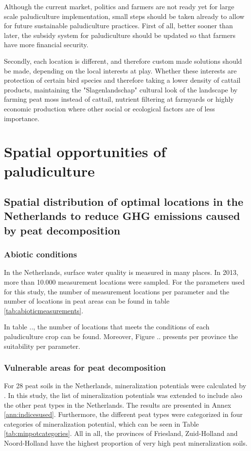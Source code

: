 {\begin{enumerate}
Although the current market, politics and farmers are not ready yet for large scale paludiculture implementation, small steps should be taken already to allow for future sustainable paludiculture practices. First of all, better sooner than later, the subsidy system for paludiculture should be updated so that farmers have more financial security. 

Secondly, each location is different, and therefore custom made solutions should be made, depending on the local interests at play. Whether these interests are protection of certain bird species and therefore taking a lower density of cattail products, maintaining the "Slagenlandschap" cultural look of the landscape by farming peat moss instead of cattail, nutrient filtering at farmyards or highly economic production where other social or ecological factors are of less importance.

\chapter{Spatial opportunities of paludiculture}

\section{Spatial distribution of optimal locations in the Netherlands to reduce GHG emissions caused by peat decomposition}

\subsection{Abiotic conditions}

In the Netherlands, surface water quality is measured in many places. In 2013, more than 10.000 measurement locations were sampled. For the parameters used for this study, the number of measurement locations per parameter and the number of locations in peat areas can be found in table \ref{tab:abioticmeasurements}.

In table .., the number of locations that meets the conditions of each paludiculture crop can be found. Moreover, Figure .. presents per province the suitability per parameter. 

\subsection{Vulnerable areas for peat decomposition}

For 28 peat soils in the Netherlands, mineralization potentials were calculated by \citep{stouthamer2008toelichting}.  In this study,  the list of mineralization potentials was extended to include also the other peat types in the Netherlands. The results are presented in Annex \ref{ann:indicesused}. Furthermore, the different peat types were categorized in four categories of mineralization potential, which can be seen in Table \ref{tab:minpotcategories}. 
All in all, the provinces of Friesland, Zuid-Holland and Noord-Holland have the highest proportion of very high peat mineralization soils.


\end{enumerate}}
